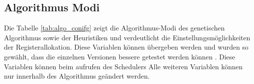 \newpage
\subsection{Algorithmus Modi}
Die Tabelle \ref{tab:algo_conifg} zeigt die Algorithmus-Modi des genetischen Algorithmus sowie der Heuristiken und verdeutlicht die Einstellungsmöglichkeiten der Registerallokation. Diese Variablen können übergeben werden und wurden so gewählt, dass die einzelnen Versionen bessere getestet werden können . Diese Variablen können beim aufrufen des Schedulers 
Alle weiteren Variablen können nur innerhalb des Algorithmus geändert werden.

%	


